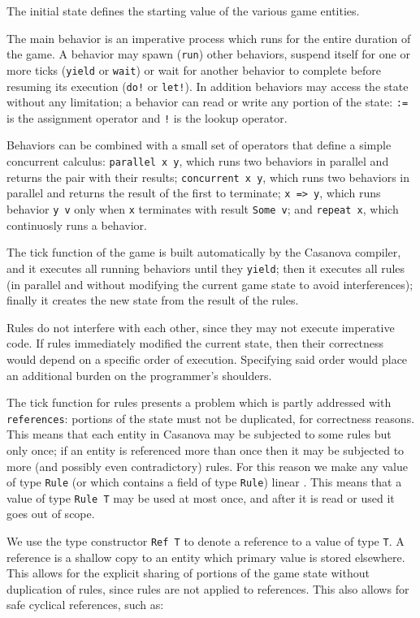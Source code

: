 The initial state defines the starting value of the various game entities.

The main behavior is an imperative process which runs for the entire duration of the game. A behavior may spawn (\texttt{run}) other behaviors, suspend itself for one or more ticks (\texttt{yield} or \texttt{wait}) or wait for another behavior to complete before resuming its execution (\texttt{do!} or \texttt{let!}). In addition behaviors may access the state without any limitation; a behavior can read or write any portion of the state: \texttt{:=} is the assignment operator and \texttt{!} is the lookup operator.

Behaviors can be combined with a small set of operators that define a simple concurrent calculus: \texttt{parallel x y}, which runs two behaviors in parallel and returns the pair with their results; \texttt{concurrent x y}, which runs two behaviors in parallel and returns the result of the first to terminate; \texttt{x => y}, which runs behavior \texttt{y v} only when \texttt{x} terminates with result \texttt{Some v}; and \texttt{repeat x}, which continuosly runs a behavior.

The tick function of the game is built automatically by the Casanova compiler, and it executes all running behaviors until they \texttt{yield}; then it executes all rules (in parallel and without modifying the current game state to avoid interferences); finally it creates the new state from the result of the rules.

Rules do not interfere with each other, since they may not execute imperative code. If rules immediately modified the current state, then their correctness would depend on a specific order of execution. Specifying said order would place an additional burden on the programmer's shoulders.

The tick function for rules presents a problem which is partly addressed with \texttt{references}: portions of the state must not be duplicated, for correctness reasons. This means that each entity in Casanova may be subjected to some rules but only once; if an entity is referenced more than once then it may be subjected to more (and possibly even contradictory) rules. For this reason we make any value of type \texttt{Rule} (or which contains a field of type \texttt{Rule}) linear \cite{LIN_TYPES}. This means that a value of type \texttt{Rule T} may be used at most once, and after it is read or used it goes out of scope.

We use the type constructor \texttt{Ref T} to denote a reference to a value of type \texttt{T}. A reference is a shallow copy to an entity which primary value is stored elsewhere. This allows for the explicit sharing of portions of the game state without duplication of rules, since rules are not applied to references. This also allows for safe cyclical references, such as:

